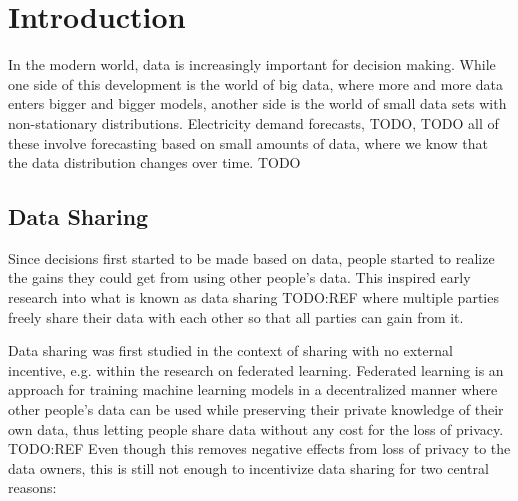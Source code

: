 
\chapter{Introduction}

In the modern world, data is increasingly important for decision making. While
one side of this development is the world of big data, where more and more data
enters bigger and bigger models, another side is the world of small data sets
with non-stationary distributions. Electricity demand forecasts, TODO, TODO
all of these involve forecasting based on small amounts of data, where we know
that the data distribution changes over time. TODO




\section{Data Sharing}

Since decisions first started to be made based on data, people started to
realize the gains they could get from using other people's data. This inspired
early research into what is known as data sharing TODO:REF where multiple
parties freely share their data with each other so that all parties can gain
from it.

Data sharing was first studied in the context of sharing with no external
incentive, e.g. within the research on federated learning. Federated learning
is an approach for training machine learning models in a decentralized manner
where other people's data can be used while preserving their private knowledge
of their own data, thus letting people share data without any cost for the loss
of privacy. TODO:REF Even though this removes negative effects from loss of
privacy to the data owners, this is still not enough to incentivize data
sharing for two central reasons:

